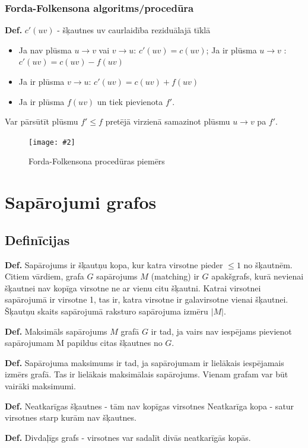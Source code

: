 \documentclass{article}
\newcommand{\illustration}[3]{
	\begin{figure}[H]
		\centering	
		\texttt{[image: \#2]}
		\caption{#3}
	\end{figure}
}
\begin{document}
\subsubsection{Forda-Folkensona algoritms/procedūra}

\textbf{Def.} $c'(uv)$ - šķautnes uv caurlaidība reziduālajā tīklā
\begin{itemize}
	\item Ja nav plūsma $u \to v$ vai $v \to u$: $c' (uv ) = c(uv )$; Ja ir plūsma $u → v$ : $c' (uv ) = c(uv ) − f (uv )$
	\item Ja ir plūsma $v \to u$: $c' (uv ) = c(uv ) + f (uv )$
	\item Ja ir plūsma $f(uv)$ un tiek pievienota $f'$.
\end{itemize}

Var pārsūtīt plūsmu $f' \le f$ pretējā virzienā samazinot plūsmu $u \to v$ pa $f'$.

\illustration{1}{Ford_Folkenson_proc-1}{Forda-Folkensona procedūras piemērs}

\section{Sapārojumi grafos}
\subsection{Definīcijas}

\textbf{Def.} Sapārojums ir šķautņu kopa, kur katra virsotne pieder $\le 1$ no šķautnēm. Citiem vārdiem, grafa $G$ sapārojums $M$ (matching) ir $G$ apakšgrafs, kurā nevienai šķautnei nav kopīga virsotne ne ar vienu citu šķautni. Katrai virsotnei sapārojumā ir virsotne 1, tas ir, katra virsotne ir galavirsotne vienai šķautnei. Šķautņu skaits sapārojumā raksturo sapārojuma izmēru $|M|$.

\textbf{Def.} Maksimāls sapārojums $M$ grafā $G$ ir tad, ja vairs nav iespējams pievienot sapārojumam M papildus citas šķautnes no $G$.

\textbf{Def.} Sapārojuma maksimums ir tad, ja sapārojumam ir lielākais iespējamais izmērs grafā. Tas ir lielākais maksimālais sapārojums.  Vienam grafam var būt vairāki maksimumi.

\textbf{Def.} Neatkarīgas šķautnes - tām nav kopīgas virsotnes Neatkarīga kopa - satur virsotnes starp kurām nav šķautnes.

\textbf{Def.} Divdaļīgs grafs - virsotnes var sadalīt divās neatkarīgās kopās.
\end{document}
